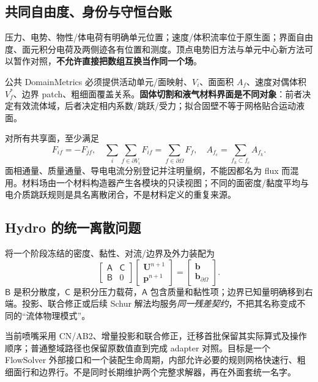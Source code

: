 \documentclass[UTF8,a4paper,11pt,fontset=fandol]{ctexart}
\numberwithin{equation}{section}
\newcommand{\mat}[1]{\mathsf{#1}}
\begin{document}
\subsection{共同自由度、身份与守恒台账}
压力、电势、物性/体电荷有明确单元位置；速度/体积流率位于原生面；界面自由度、面元积分电荷及两侧迹各有位置和测度。顶点电势旧方法与单元中心新方法可以暂作对照，\textbf{不允许直接把数组互换当作同一个场}。

公共 DomainMetrics 必须提供活动单元/面映射、$V_i$、面面积 $A_f$、速度对偶体积 $V_f^*$、边界 patch、粗细面覆盖关系。\textbf{固体切割和液气材料界面是不同对象}：前者决定有效流体域，后者决定相内系数/跳跃/受力；拟合固壁不等于网格贴合运动液面。

对所有共享面，至少满足
\begin{equation}
 F_{if}=-F_{jf},\quad
 \sum_i\sum_{f\in\partial V_i}F_{if}=\sum_{f\in\partial\Omega}F_f,\quad
 A_{f_c}=\sum_{f_k\subset f_c}A_{f_k}.
\end{equation}
面相通量、质量通量、导电电流分别登记并注明量纲，不能因都名为 flux 而混用。材料场由一个材料构造器产生各模块的只读视图；不同的面密度/黏度平均与电介质跳跃规则是具名离散闭合，不是材料定义的重复来源。

\subsection{Hydro 的统一离散问题}
将一个阶段冻结的密度、黏性、对流/边界及外力装配为
\begin{equation}
 \begin{bmatrix}\mat A&\mat C\\\mat B&0\end{bmatrix}
 \begin{bmatrix}\bm U^{n+1}\\\bm p^{n+1}\end{bmatrix}
 =\begin{bmatrix}\bm b\\\bm b_{\partial\Omega}\end{bmatrix}.\label{eq:saddle}
\end{equation}
$\mat B$ 是积分散度，$\mat C$ 是积分压力载荷，$\mat A$ 包含质量和黏性项；边界已知量明确移到右端。投影、联合修正或后续 Schur 解法均服务\emph{同一残差契约}，不把其名称变成不同的“流体物理模式”。

当前喷嘴采用 CN/AB2、增量投影和联合修正，迁移首批保留其实际算式及操作顺序；普通整域路径也保留原数值直到完成 adapter 对照。目标是一个 FlowSolver 外部接口和一个装配生命周期，内部允许必要的规则网格快速行、粗细面行和边界行。不是同时长期维护两个完整求解器，再在外面套统一名字。
\end{document}
